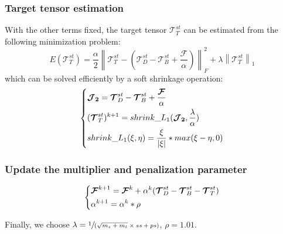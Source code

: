 \documentclass[journal]{IEEEtran}
\begin{document}
\subsubsection{Target tensor estimation}
With the other terms fixed, the target tensor $\bm{\mathcal T}_T^{st}$ can be estimated from the following minimization problem:
\begin{equation}
  E(\bm{\mathcal T}_T^{st})=\frac{\alpha}{2} \left \|\bm{\mathcal T}_T^{st}-(\bm{\mathcal T}_D^{st}-\bm{\mathcal T}_B^{st}+\frac{\bm{\mathcal F}}{\alpha}) \right \|_F^2 + \lambda \left \|\bm{\mathcal T}_T^{st} \right \| _1
  \label{optimization2}
\end{equation}
which can be solved efficiently by a soft shrinkage operation:
\begin{equation}
  \begin{dcases}
    \bm{\mathcal J_2}=\bm{\mathcal T}_D^{st}-\bm{\mathcal T}_B^{st}+\frac{\bm{\mathcal F}}{\alpha}\\
    (\bm{\mathcal T}_T^{st})^{k+1}=shrink\_L_{1}(\bm{\mathcal J_2},\frac{\lambda}{\alpha})\\
    shrink\_L_{1}(\xi,\eta)=\frac{\xi}{|\xi|} \ast max(\xi-\eta,0)
  \end{dcases}
  \label{opti2}
\end{equation}

\subsubsection{Update the multiplier and penalization parameter}
\begin{equation}
  \begin{dcases}
    \bm{\mathcal F}^{k+1}=\bm{\mathcal F}^{k}+\alpha^{k}(\bm{\mathcal T}_D^{st}-\bm{\mathcal T}_B^{st}-\bm{\mathcal T}_T^{st})\\
    \alpha^{k+1}=\alpha^{k} \ast \rho
  \end{dcases}
  \label{optimization3}
\end{equation}

Finally, we choose $\lambda=\sfrac{1}{(\sqrt{m_s+m_t}\times ss + ps)}$, $\rho=1.01$.
\end{document}
